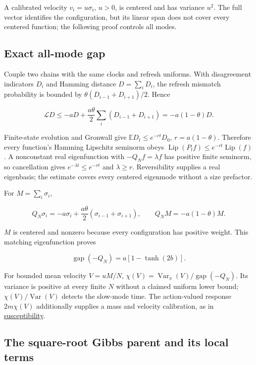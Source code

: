 \documentclass[11pt,a4paper]{article}
\begin{document}
A calibrated velocity \(v_i=u\sigma_i\), \(u>0\), is centered and has
variance \(u^2\). The full vector identifies the configuration, but its
linear span does not cover every centered function; the following proof
controls all modes.

\hypertarget{exact-all-mode-gap}{%
\subsection{Exact all-mode gap}\label{exact-all-mode-gap}}

Couple two chains with the same clocks and refresh uniforms. With
disagreement indicators \(D_i\) and Hamming distance \(D=\sum_iD_i\),
the refresh mismatch probability is bounded by
\(\theta(D_{i-1}+D_{i+1})/2\). Hence

\[\mathcal L D\le-aD+\frac{a\theta}2\sum_i(D_{i-1}+D_{i+1})
 =-a(1-\theta)D.\]

Finite-state evolution and Gronwall give \(\mathbb ED_t\le e^{-rt}D_0\),
\(r=a(1-\theta)\). Therefore every function's Hamming Lipschitz seminorm
obeys \(\operatorname{Lip}(P_tf)\le e^{-rt}\operatorname{Lip}(f)\). A
nonconstant real eigenfunction with \(-Q_Nf=\lambda f\) has positive
finite seminorm, so cancellation gives \(e^{-\lambda t}\le e^{-rt}\) and
\(\lambda\ge r\). Reversibility supplies a real eigenbasis; the estimate
covers every centered eigenmode without a size prefactor.

For \(M=\sum_i\sigma_i\),

\[Q_N\sigma_i=-a\sigma_i+\frac{a\theta}2(\sigma_{i-1}+\sigma_{i+1}),
\qquad Q_NM=-a(1-\theta)M.\]

\(M\) is centered and nonzero because every configuration has positive
weight. This matching eigenfunction proves

\[\boxed{\operatorname{gap}(-Q_N)=a[1-\tanh(2b)].}\]

For bounded mean velocity \(V=uM/N\),
\(\chi(V)=\operatorname{Var}_\pi(V)/\operatorname{gap}(-Q_N)\). Its
variance is positive at every finite \(N\) without a claimed uniform
lower bound; \(\chi(V)/\operatorname{Var}(V)\) detects the slow-mode
time. The action-valued response \(2m\chi(V)\) additionally supplies a
mass and velocity calibration, as in
\href{susceptibility-gap.md}{susceptibility}.

\hypertarget{the-square-root-gibbs-parent-and-its-local-terms}{%
\subsection{The square-root Gibbs parent and its local
terms}\label{the-square-root-gibbs-parent-and-its-local-terms}}
\end{document}
